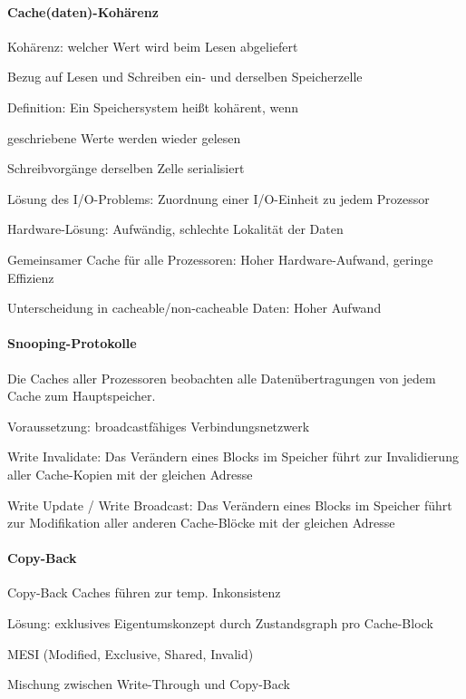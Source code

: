 \documentclass[10pt,landscape]{article}
\begin{document}
\begin{multicols}{3}
  \paragraph{Cache(daten)-Kohärenz}
  \begin{itemize*}
    \item Kohärenz: welcher Wert wird beim Lesen abgeliefert
    \item Bezug auf Lesen und Schreiben ein- und derselben Speicherzelle
    \item Definition: Ein Speichersystem heißt kohärent, wenn
    \begin{itemize*}
      \item geschriebene Werte werden wieder gelesen
      \item Schreibvorgänge derselben Zelle serialisiert
    \end{itemize*}
    \item Lösung des I/O-Problems: Zuordnung einer I/O-Einheit zu jedem Prozessor
    \item Hardware-Lösung: Aufwändig, schlechte Lokalität der Daten
    \item Gemeinsamer Cache für alle Prozessoren: Hoher Hardware-Aufwand, geringe Effizienz
    \item Unterscheidung in cacheable/non-cacheable Daten: Hoher Aufwand
  \end{itemize*}
  
  \paragraph{Snooping-Protokolle}
  \begin{itemize*}
    \item Die Caches aller Prozessoren beobachten alle Datenübertragungen von jedem Cache zum Hauptspeicher.
    \item Voraussetzung: broadcastfähiges Verbindungsnetzwerk
    \item Write Invalidate: Das Verändern eines Blocks im Speicher führt zur Invalidierung aller Cache-Kopien mit der gleichen Adresse
    \item Write Update / Write Broadcast: Das Verändern eines Blocks im Speicher führt zur Modifikation aller anderen Cache-Blöcke mit der gleichen Adresse
  \end{itemize*}
  
  \paragraph{Copy-Back}
  \begin{itemize*}
    \item Copy-Back Caches führen zur temp. Inkonsistenz
    \item Lösung: exklusives Eigentumskonzept durch Zustandsgraph pro Cache-Block
    \item MESI (Modified, Exclusive, Shared, Invalid)
    \item Mischung zwischen Write-Through und Copy-Back
  \end{itemize*}
  

\end{multicols}
\end{document}

